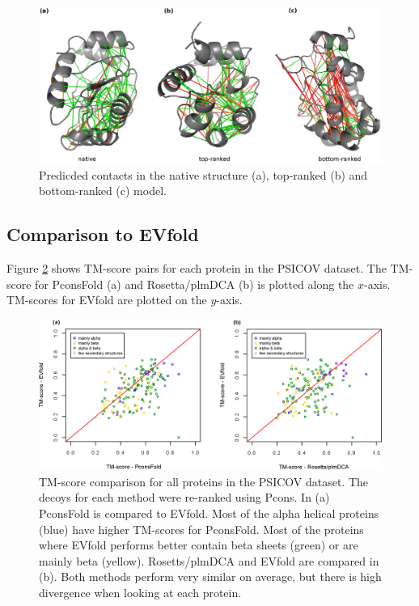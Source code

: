 \documentclass{bioinfo}
\begin{document}
\begin{figure}[!tpb]%
\centerline{\includegraphics[scale=0.7]{figures/qa.eps}}
\caption{Predicded contacts in the native structure (a), top-ranked (b) and bottom-ranked (c) model.}\label{fig:vs}
\end{figure}


\subsection{Comparison to EVfold}

Figure \ref{fig:vs} shows TM-score pairs for each protein in the PSICOV dataset. The TM-score for PconsFold (a) and Rosetta/plmDCA (b) is plotted along the $x$-axis. TM-scores for EVfold are plotted on the $y$-axis. 
\begin{figure}[!tpb]%
\centerline{\includegraphics[scale=0.7]{figures/vs.eps}}
\caption{TM-score comparison for all proteins in the PSICOV dataset. The decoys for each method were re-ranked using Pcons. In (a) PconsFold is compared to EVfold. Most of the alpha helical proteins (blue) have higher TM-scores for PconsFold. Most of the proteins where EVfold performs better contain beta sheets (green) or are mainly beta (yellow). Rosetts/plmDCA and EVfold are compared in (b). Both methods perform very similar on average, but there is high divergence when looking at each protein.}\label{fig:vs}
\end{figure}
\end{document}
